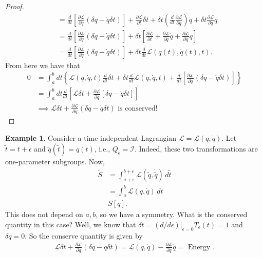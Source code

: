 \documentclass{book}
\theoremstyle{definition}
\newtheorem{exmp}{Example}[section]
\newcommand{\p}{\partial}
\newcommand{\lag}{\mathcal{L}}
\newcommand{\nn}{\nonumber}
\newcommand{\ep}{\epsilon}
\newcommand{\f}[2]{\frac{#1}{#2}}
\newcommand{\td}[1]{\tilde{#1}}
\newcommand{\lp}{\left(}
\newcommand{\rp}{\right)}
\newcommand{\lb}{\left[}
\newcommand{\rb}{\right]}
\newcommand{\lc}{\left\{}
\newcommand{\rc}{\right\}}
\newcommand{\Id}{\mathcal{I}}
\begin{document}
\begin{proof}
\begin{align}
	&= \f{d}{dt}\lb \f{\p \lag}{\p \dot{q}} (\delta q - \dot{q}\delta t) \rb + \f{\p \lag}{\p t}\delta t + \delta t \lp \f{d}{dt}\f{\p \lag}{\p \dot{q}} \rp\dot{q} + \delta t \f{\p \lag}{\p \dot{q}}\ddot{q}\nn\\
	&= \f{d}{dt}\lb \f{\p \lag}{\p \dot{q}} (\delta q - \dot{q}\delta t) \rb + \delta t\lb \f{\p \lag}{\p t} + \f{\p \lag}{\p q}\dot{q} + \f{\p \lag}{\p \dot{q}} \ddot{q} \rb\nn\\
	&=  \f{d}{dt}\lb \f{\p \lag}{\p \dot{q}} (\delta q - \dot{q}\delta t) \rb + \delta t \f{d}{dt}\lag(q(t),\dot{q}(t),t).
	\end{align}
	From here we have that
	\begin{align}
	0 &= \int^b_a dt\lc \lag(q,\dot{q},t)\f{d}{dt}\delta t + \delta t \f{d}{dt}\lag(q,\dot{q},t) + \f{d}{dt}\lb \f{\p \lag}{\p \dot{q}}(\delta q - \dot{q}\delta t) \rb \rc\nn\\
	&= \int^b_a dt \f{d}{dt}\lb \lag \delta t + \f{\p \lag}{\p \dot{q}}\lb  \delta q - \dot{q}\delta t \rb \rb\nn\\
	&\implies \boxed{\lag \delta t + \f{\p \lag}{\p \dot{q}}(\delta q - \dot{q}\delta t) \text{ is conserved!}}
	\end{align}
	
\end{proof}




\begin{exmp}
	Consider a time-independent Lagrangian $\lag = \lag(q,\dot{q})$. Let $\td{t} = t+\ep$ and $\td{q}(\td{t}) = q(t)$, i.e., $Q_\ep = \Id$. Indeed, these two transformations are one-parameter subgroups. Now,
	\begin{align}
	\td{S} &= \int^{b+\ep}_{a+\ep}\lag(\td{q},\dot{\td{q}})\,d\td{t}\nn\\
	&= \int^b_a \lag(q,\dot{q})\,dt \nn\\
	& S[q].
	\end{align}
	This does not depend on $a,b$, so we have a symmetry. What is the conserved quantity in this case? Well, we know that $\delta t = (d/d\ep)\big\vert_{\ep=0}T_\ep(t) = 1$ and $\delta q = 0$. So the conserve quantity is given by
	\begin{align}
	\lag \delta t + \f{\p \lag}{\p \dot{q}}\lp \delta q - \dot{q}\delta t\rp = \lag(q,\dot{q}) - \f{\p \lag}{\p \dot{q}}\dot{q} = \text{ Energy }.
	\end{align}
\end{exmp}
\end{document}
